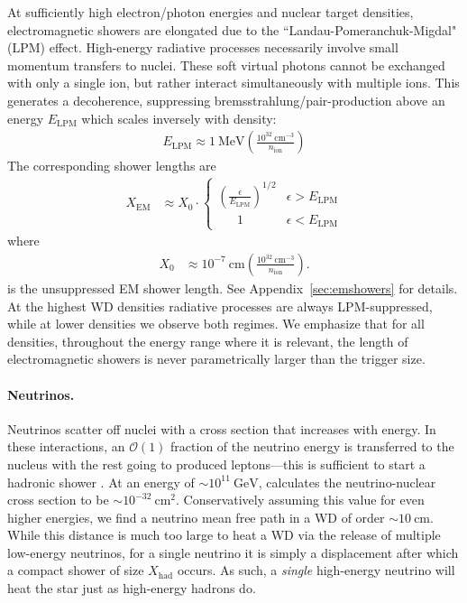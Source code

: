 \documentclass[preprintnumbers,amsmath,amssymb,prd,superscriptaddress]{revtex4}
\newcommand{\OO}{\mathcal{O}}
\newcommand{\GeV}{\text{GeV}}
\newcommand{\MeV}{\text{MeV}}
\newcommand{\cm}{\text{cm}}
\def\r{\right)}
\def\l{\left(}
\begin{document}
At sufficiently high electron/photon energies and nuclear target densities, electromagnetic showers are elongated due to the ``Landau-Pomeranchuk-Migdal" (LPM) effect.
High-energy radiative processes necessarily involve small momentum transfers to nuclei.
These soft virtual photons cannot be exchanged with only a single ion, but rather interact simultaneously with multiple ions.
This generates a decoherence, suppressing bremsstrahlung/pair-production above an energy $E_\text{LPM}$ which scales inversely with density:
\begin{align}
    E_\text{LPM} \approx 1~\MeV
    \l \frac{10^{32}~\text{cm}^{-3}}{n_\text{ion}} \r
\end{align}
The corresponding shower lengths are
\begin{align}
  X_\text{EM} &\approx X_0 \cdot
  \begin{cases}
  \l \frac{\epsilon}{E_\text{LPM}} \r^{1/2} & \epsilon > E_\text{LPM} \\
  \;\;\;\;\;\, 1 & \epsilon < E_\text{LPM}
  \end{cases}
\end{align}
where
\begin{align}
  X_0 &\approx 10^{-7} ~\text{cm}
  \l\frac{10^{32}~\text{cm}^{-3}}{n_\text{ion}}\r.
\end{align}
is the unsuppressed EM shower length.
See Appendix~\ref{sec:emshowers} for details.
At the highest WD densities radiative processes are always LPM-suppressed, while at lower densities we observe both regimes.
We emphasize that for all densities, throughout the energy range where it is relevant, the length of electromagnetic showers is never parametrically larger than the trigger size.

\paragraph{Neutrinos.}
Neutrinos scatter off nuclei with a cross section that increases with energy.
In these interactions, an $\OO(1)$ fraction of the neutrino energy is transferred to the nucleus with the rest going to produced leptons---this is sufficient to start a hadronic shower \cite{Gandhi:1998ri, Formaggio:2013kya}.
At an energy of $\sim 10^{11} ~\GeV$, \cite{Gandhi:1998ri} calculates the neutrino-nuclear cross section to be $\sim 10^{-32} ~\cm^2$.
Conservatively assuming this value for even higher energies, we find a neutrino mean free path in a WD of order $\sim 10 ~\cm$.
While this distance is much too large to heat a WD via the release of multiple low-energy neutrinos, for a single neutrino it is simply a displacement after which a compact shower of size $X_\text{had}$ occurs.
As such, a \emph{single} high-energy neutrino will heat the star just as high-energy hadrons do.
\end{document}
